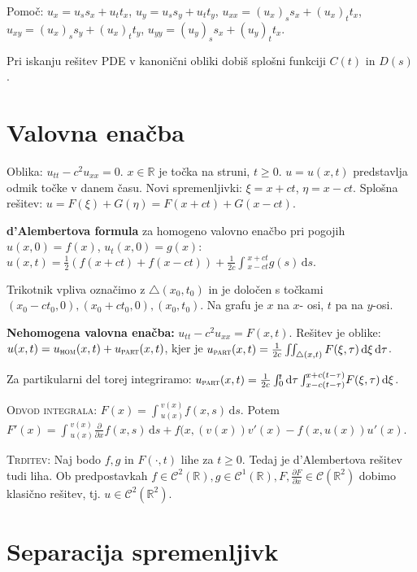 \documentclass[10pt,a4paper]{amsart}
\theoremstyle{definition} %
\theoremstyle{plain} %
\newcommand{\dd}[1]{\ensuremath{\,\mathrm{d}#1}}
\let\oldint\int
\renewcommand{\int}{\oldint \!}
\newcommand{\R}{\mathbb R}
\begin{document}
Pomoč: $u_x = u_s s_x + u_t t_x$, $u_y = u_s s_y + u_t t_y$, $u_{xx} = (u_x)_s
s_x + (u_x)_t t_x$, $u_{xy} = (u_x)_s s_y + (u_x)_t t_y$,  $u_{yy} = (u_y)_s s_x
+ (u_y)_t t_x$.

Pri iskanju rešitev PDE v kanonični obliki dobiš splošni funkciji $C(t)$ in
$D(s)$.


\section*{Valovna enačba}

Oblika: $u_{tt} - c^2u_{xx} = 0$. $x \in \R$ je točka na struni, $t \geq 0$. $u
= u(x,t)$ predstavlja odmik točke v danem času. Novi spremenljivki: $\xi =
x+ct$, $\eta = x-ct$. Splošna rešitev: $u = F(\xi) + G(\eta) = F(x+ct) +
G(x-ct)$.

\textbf{d'Alembertova formula} za homogeno valovno enačbo pri pogojih $u(x,0) =
f(x)$, $u_t(x,0)=g(x)$: $ u(x,t) = \frac{1}{2}(f(x+ct)+f(x-ct)) + \frac{1}{2c}
\int_{x-ct}^{x+ct} g(s) \dd{s}.  $

Trikotnik vpliva označimo z $\bigtriangleup(x_0,t_0)$ in je določen s točkami
$(x_0-ct_0,0), (x_0+ct_0,0), (x_0,t_0)$. Na grafu je $x$ na $x$- osi, $t$ pa na
$y$-osi.

\textbf{Nehomogena valovna enačba:} $u_{tt} - c^2u_{xx} = F(x,t)$. Rešitev je
oblike: $u(x,t) = u_{\text{\textsc{hom}}}(x,t) + u_{\text{\textsc{part}}}(x,t)$,
kjer je $ u_{\text{\textsc{part}}}(x,t) = \frac{1}{2c} \iint_{\bigtriangleup
(x,t)}F(\xi,\tau)\dd{\xi} \dd{\tau}$.

Za partikularni del torej integriramo: $ u_{\text{\textsc{part}}}(x,t) =
\frac{1}{2c} \int_0^t \dd{\tau}
\int_{x-c(t-\tau)}^{x+c(t-\tau)}F(\xi,\tau)\dd{\xi}$.

\textsc{Odvod integrala:} $F(x) = \int_{u(x)}^{v(x)}f(x,s)\dd{s}$. Potem
$F'(x) =  \int_{u(x)}^{v(x)} \frac{\partial}{\partial x}f(x,s)\dd{s} +
f(x,(v(x))v'(x) - f(x,u(x))u'(x)$.

\textsc{Trditev:} Naj bodo $f, g$ in $F(\cdot ,t)$ lihe za $t \geq 0$. Tedaj je
d'Alembertova rešitev tudi liha. Ob predpostavkah $f \in \mathcal{C}^2(\R ), g
\in \mathcal{C}^1(\R ), F, \frac{\partial F}{\partial x} \in \mathcal{C}(\R^2 )$
dobimo klasično rešitev, tj. $u \in \mathcal{C}^2(\R^2 )$.


\section*{Separacija spremenljivk}
\end{document}
